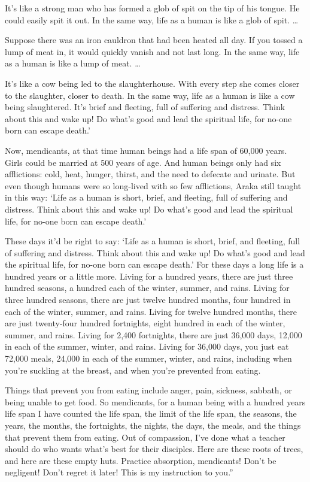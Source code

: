 \documentclass[12pt,openany]{book}%
\begin{document}
It’s like a strong man who has formed a glob of spit on the tip of his tongue. He could easily spit it out. In the same way, life as a human is like a glob of spit. … 

Suppose there was an iron cauldron that had been heated all day. If you tossed a lump of meat in, it would quickly vanish and not last long. In the same way, life as a human is like a lump of meat. … 

It’s like a cow being led to the slaughterhouse. With every step she comes closer to the slaughter, closer to death. In the same way, life as a human is like a cow being slaughtered. It’s brief and fleeting, full of suffering and distress. Think about this and wake up! Do what’s good and lead the spiritual life, for no-one born can escape death.’ 

Now, mendicants, at that time human beings had a life span of 60,000 years. Girls could be married at 500 years of age. And human beings only had six afflictions: cold, heat, hunger, thirst, and the need to defecate and urinate. But even though humans were so long-lived with so few afflictions, Araka still taught in this way: ‘Life as a human is short, brief, and fleeting, full of suffering and distress. Think about this and wake up! Do what’s good and lead the spiritual life, for no-one born can escape death.’ 

These days it’d be right to say: ‘Life as a human is short, brief, and fleeting, full of suffering and distress. Think about this and wake up! Do what’s good and lead the spiritual life, for no-one born can escape death.’ For these days a long life is a hundred years or a little more. Living for a hundred years, there are just three hundred seasons, a hundred each of the winter, summer, and rains. Living for three hundred seasons, there are just twelve hundred months, four hundred in each of the winter, summer, and rains. Living for twelve hundred months, there are just twenty-four hundred fortnights, eight hundred in each of the winter, summer, and rains. Living for 2,400 fortnights, there are just 36,000 days, 12,000 in each of the summer, winter, and rains. Living for 36,000 days, you just eat 72,000 meals, 24,000 in each of the summer, winter, and rains, including when you’re suckling at the breast, and when you’re prevented from eating. 

Things that prevent you from eating include anger, pain, sickness, sabbath, or being unable to get food. So mendicants, for a human being with a hundred years life span I have counted the life span, the limit of the life span, the seasons, the years, the months, the fortnights, the nights, the days, the meals, and the things that prevent them from eating. Out of compassion, I’ve done what a teacher should do who wants what’s best for their disciples. Here are these roots of trees, and here are these empty huts. Practice absorption, mendicants! Don’t be negligent! Don’t regret it later! This is my instruction to you.” 
\end{document}
